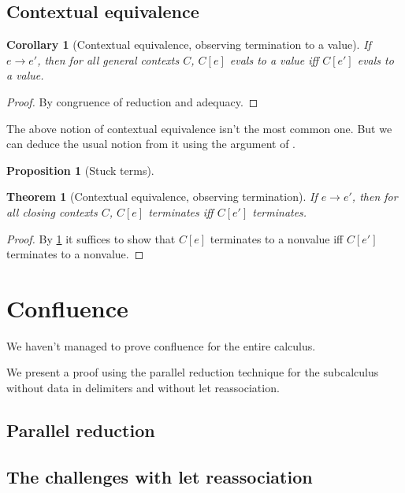 \documentclass[a4paper, 11pt,titlepage, openright, twoside]{report}
\newcommand{\+}{\enspace}
\newtheorem{corollary}{Corollary}
\newtheorem{theorem}{Theorem}
\newtheorem{prop}{Proposition}
\begin{document}

\section{Contextual equivalence}

\begin{corollary}[Contextual equivalence, observing termination to a value]
	\label{ctxeqv1}
	If $e → e'$, then for all general contexts $C$, $C[e]$ evals to a value iff $C[e']$ evals to a value.%
\end{corollary}
\begin{proof}
	By congruence of reduction and adequacy.
\end{proof}

The above notion of contextual equivalence isn't the most common one.
But we can deduce the usual notion from it using the argument of \cite{bisim}.

\begin{prop}[Stuck terms]
\end{prop}

\begin{theorem}[Contextual equivalence, observing termination]
	If $e → e'$, then for all closing contexts $C$, $C[e]$ terminates iff $C[e']$ terminates.
\end{theorem}
\begin{proof}
	By \ref{ctxeqv1} it suffices to show that
	$C[e]$ terminates to a nonvalue iff $C[e']$ terminates to a nonvalue.
\end{proof}



\chapter{Confluence}

We haven't managed to prove confluence for
the entire calculus.

We present a proof using the parallel reduction technique for the subcalculus without
data in delimiters and without let reassociation.

\section{Parallel reduction}

\section{The challenges with \textsf{let} reassociation}
\end{document}
